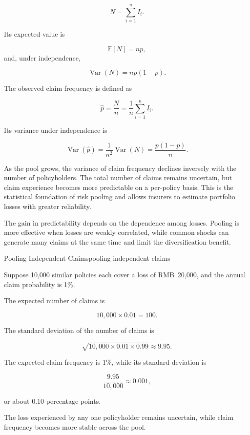 \begin{equation}
N=\sum_{i=1}^{n}I_i.
\label{eq:ch15-number-of-claims}
\end{equation}

Its expected value is

\begin{equation}
\mathbb{E}[N]=np,
\label{eq:ch15-expected-claims}
\end{equation}
and, under independence,

\begin{equation}
\operatorname{Var}(N)=np(1-p).
\label{eq:ch15-claims-variance}
\end{equation}

The observed claim frequency is defined as

\begin{equation}
\hat p=\frac{N}{n}
=\frac{1}{n}\sum_{i=1}^{n}I_i.
\end{equation}

Its variance under independence is

\begin{equation}
\operatorname{Var}(\hat p)
=\frac{1}{n^2}\operatorname{Var}(N)=\frac{p(1-p)}{n}.
\label{eq:ch15-frequency-variance}
\end{equation}

As the pool grows, the variance of claim frequency declines
inversely with the number of policyholders. The total number
of claims remains uncertain, but claim experience becomes
more predictable on a per-policy basis. This is the
statistical foundation of risk pooling and allows insurers
to estimate portfolio losses with greater reliability.

The gain in predictability depends on the dependence among
losses. Pooling is more effective when losses are weakly
correlated, while common shocks can generate many claims
at the same time and limit the diversification benefit.

\begin{example}{Pooling Independent Claims}{pooling-independent-claims}

Suppose 10,000 similar policies each cover a loss of RMB~20,000, and the annual claim probability is 1\%.

The expected number of claims is

$$
10{,}000\times 0.01=100.
$$

The standard deviation of the number of claims is

$$
\sqrt{10{,}000\times 0.01\times 0.99}
\approx 9.95.
$$

The expected claim frequency is 1\%, while its standard deviation is

$$
\frac{9.95}{10{,}000}
\approx 0.001,
$$

or about 0.10 percentage points.

The loss experienced by any one policyholder remains uncertain, while claim frequency becomes more stable across the pool.

\end{example}


